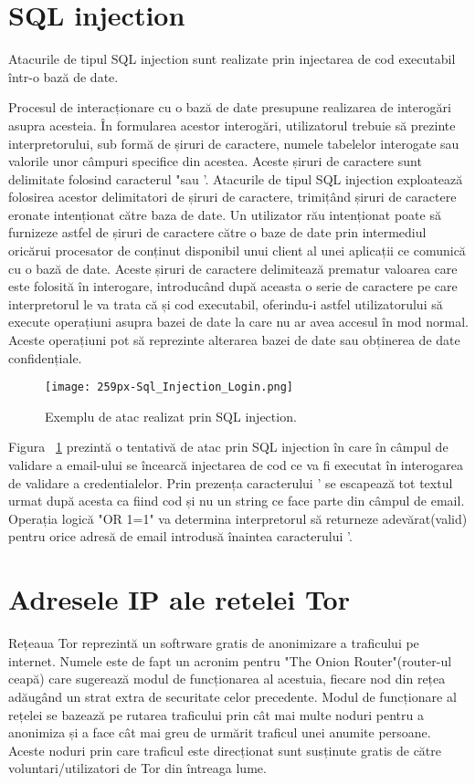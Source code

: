 \section{SQL injection}

Atacurile de tipul SQL injection sunt realizate prin injectarea de cod executabil într-o bază de date. 

Procesul de interacționare cu o bază de date presupune realizarea de interogări asupra acesteia. În formularea acestor interogări, utilizatorul trebuie să prezinte interpretorului, sub formă de șiruri de caractere, numele tabelelor interogate sau valorile unor câmpuri specifice din acestea. Aceste șiruri de caractere sunt delimitate folosind caracterul "sau '. Atacurile de tipul SQL injection exploatează folosirea acestor delimitatori de șiruri de caractere, trimițând șiruri de caractere eronate intenționat către baza de date. Un utilizator rău intenționat poate să furnizeze astfel de șiruri de caractere către o baze de date prin intermediul oricărui procesator de conținut disponibil unui client al unei aplicații ce comunică cu o bază de date. Aceste șiruri de caractere delimitează prematur valoarea care este folosită în interogare, introducând după aceasta o serie de caractere pe care interpretorul le va trata că și cod executabil, oferindu-i astfel utilizatorului să execute operațiuni asupra bazei de date la care nu ar avea accesul în mod normal. Aceste operațiuni pot să reprezinte alterarea bazei de date sau obținerea de date confidențiale. \\



\begin{figure}[h]
	\centering
	\texttt{[image: 259px-Sql\_Injection\_Login.png]}
	\caption{Exemplu de atac realizat prin SQL injection.}
	\label{fig:sqli-example}
\end{figure}

Figura ~\ref{fig:sqli-example}  prezintă o tentativă de atac prin SQL injection în care în câmpul de validare a email-ului se încearcă injectarea de cod ce va fi executat în interogarea de validare a credentialelor. Prin prezența caracterului ' se escapează tot textul urmat după acesta ca fiind cod și nu un string ce face parte din câmpul de email. Operația logică "OR 1=1" va determina interpretorul să returneze adevărat(valid) pentru orice adresă de email introdusă înaintea caracterului  '. \\


\section{Adresele IP ale retelei Tor}
Rețeaua Tor reprezintă un softrware gratis de anonimizare a traficului pe internet. Numele este de fapt un acronim pentru "The Onion Router"(router-ul ceapă) care sugerează modul de funcționarea al acestuia, fiecare nod din rețea adăugând un strat extra de securitate celor precedente. Modul de funcționare al rețelei se bazează pe rutarea traficului prin cât mai multe noduri pentru a anonimiza și a face cât mai greu de urmărit traficul unei anumite persoane. Aceste noduri prin care traficul este direcționat sunt susținute gratis de către voluntari/utilizatori de Tor din întreaga lume. 


